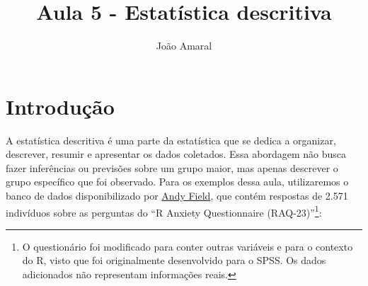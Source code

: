 \documentclass[
  letterpaper,
  DIV=11,
  numbers=noendperiod]{scrartcl}
\title{Aula 5 - Estatística descritiva}
\author{João Amaral}
\date{}
\renewcommand*\contentsname{Table of contents}
\newcommand\contentsname{Table of contents}
\begin{document}
\maketitle
\ifdefined\Shaded\renewenvironment{Shaded}{\begin{tcolorbox}[borderline west={3pt}{0pt}{shadecolor}, sharp corners, interior hidden, enhanced, breakable, boxrule=0pt, frame hidden]}{\end{tcolorbox}}\fi

\renewcommand*\contentsname{Table of contents}
{
\hypersetup{linkcolor=}
\setcounter{tocdepth}{3}
\tableofcontents
}
\hypertarget{introduuxe7uxe3o}{%
\section{Introdução}\label{introduuxe7uxe3o}}

A estatística descritiva é uma parte da estatística que se dedica a
organizar, descrever, resumir e apresentar os dados coletados. Essa
abordagem não busca fazer inferências ou previsões sobre um grupo maior,
mas apenas descrever o grupo específico que foi observado. Para os
exemplos dessa aula, utilizaremos o banco de dados disponibilizado por
\href{https://edge.sagepub.com/field5e/student-resources/datasets}{Andy
Field}, que contém respostas de 2.571 indivíduos sobre as perguntas do
``R Anxiety Questionnaire (RAQ-23)''\footnote{O questionário foi
  modificado para conter outras variáveis e para o contexto do R, visto
  que foi originalmente desenvolvido para o SPSS. Os dados adicionados
  não representam informações reais.}:
\end{document}
